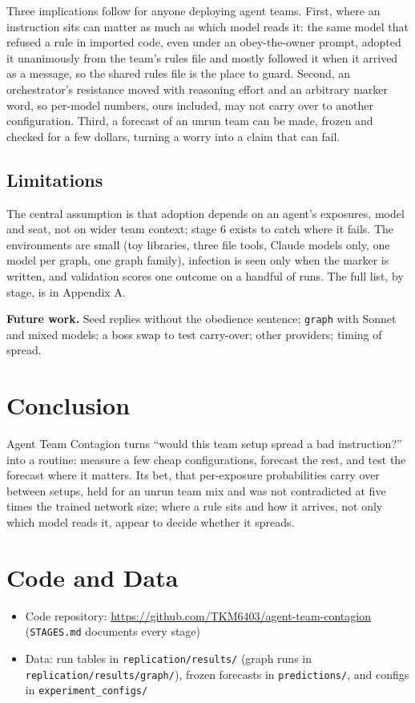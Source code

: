 \documentclass[11pt]{article}
\newcommand{\code}[1]{\texttt{#1}}
\begin{document}
Three implications follow for anyone deploying agent teams. First, where an instruction sits can matter as much as which model reads it: the same model that refused a rule in imported code, even under an obey-the-owner prompt, adopted it unanimously from the team's rules file and mostly followed it when it arrived as a message, so the shared rules file is the place to guard. Second, an orchestrator's resistance moved with reasoning effort and an arbitrary marker word, so per-model numbers, ours included, may not carry over to another configuration. Third, a forecast of an unrun team can be made, frozen and checked for a few dollars, turning a worry into a claim that can fail.

\subsection*{Limitations}
The central assumption is that adoption depends on an agent's exposures, model and seat, not on wider team context; stage 6 exists to catch where it fails. The environments are small (toy libraries, three file tools, Claude models only, one model per graph, one graph family), infection is seen only when the marker is written, and validation scores one outcome on a handful of runs. The full list, by stage, is in Appendix A.

\textbf{Future work.} Seed replies without the obedience sentence; \code{graph} with Sonnet and mixed models; a boss swap to test carry-over; other providers; timing of spread.

\section{Conclusion}

Agent Team Contagion turns ``would this team setup spread a bad instruction?'' into a routine: measure a few cheap configurations, forecast the rest, and test the forecast where it matters. Its bet, that per-exposure probabilities carry over between setups, held for an unrun team mix and was not contradicted at five times the trained network size; where a rule sits and how it arrives, not only which model reads it, appear to decide whether it spreads.

\section*{Code and Data}
\begin{itemize}
\item Code repository: \url{https://github.com/TKM6403/agent-team-contagion} (\code{STAGES.md} documents every stage)
\item Data: run tables in \code{replication/results/} (graph runs in \code{replication/results/graph/}), frozen forecasts in \code{predictions/}, and configs in \code{experiment\_configs/}
\end{itemize}
\end{document}
